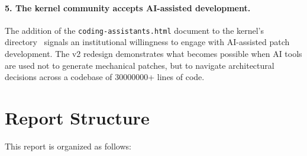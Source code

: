 \paragraph{5. The kernel community accepts AI-assisted development.}
The addition of the \texttt{coding-assistants.html} document to the kernel's
 directory~\cite{coding-assistants} signals an
institutional willingness to engage with AI-assisted patch development.  The v2
redesign demonstrates what becomes possible when AI tools are used not to
generate mechanical patches, but to navigate architectural decisions across a
codebase of \num{30000000}+ lines of code.


\section{Report Structure}
\label{sec:intro-structure}

This report is organized as follows:

